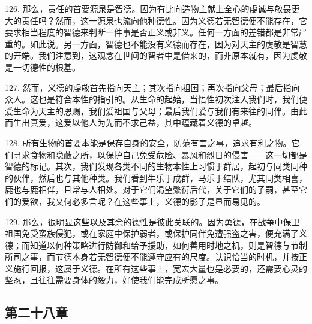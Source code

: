 \par

126. 那么，责任的首要源泉是智德。因为有比向造物主献上全心的虔诚与敬畏更大的责任吗？然而，这一源泉也流向他种德性。因为义德若无智德便不能存在，它要求相当程度的智德来判断一件事是否正义或非义。任何一方面的差错都是非常严重的。如此说。另一方面，智德也不能没有义德而存在，因为对天主的虔敬是智慧的开端。我们注意到，这观念在世间的智者中是借来的，而非原本就有，因为虔敬是一切德性的根基。\par

127. 然而，义德的虔敬首先指向天主；其次指向祖国；再次指向父母；最后指向众人。这也是符合本性的指引的。从生命的起始，当悟性初次注入我们时，我们便爱生命为天主的恩赐，我们爱祖国与父母；最后我们爱与我们有来往的同伴。由此而生出真爱，这爱以他人为先而不求己益，其中蕴藏着义德的卓越。\par

128. 所有生物的首要本能是保存自身的安全，防范有害之事，追求有利之物。它们寻求食物和隐蔽之所，以保护自己免受危险、暴风和烈日的侵害——这一切都是智德的标记。其次，我们发现各类不同的生物本性上习惯于群居，起初与同类同种的伙伴，然后也与其他种类。我们看到牛乐于成群，马乐于结队，尤其同类相喜，鹿也与鹿相伴，且常与人相处。对于它们渴望繁衍后代，关于它们的子嗣，甚至它们的爱欲，我又何必多言呢？在这些事上，义德的影子是显而易见的。\par

129. 那么，很明显这些以及其余的德性是彼此关联的。因为勇德，在战争中保卫祖国免受蛮族侵犯，或在家庭中保护弱者，或保护同伴免遭强盗之害，便充满了义德；而知道以何种策略进行防御和给予援助，如何善用时地之机，则是智德与节制所司之事，而节德本身若无智德便不能遵守应有的尺度。认识恰当的时机，并按正义施行回报，这属于义德。在所有这些事上，宽宏大量也是必要的，还需要心灵的坚忍，且往往需要身体的毅力，好使我们能完成所愿之事。\par


\subsection{第二十八章}

\par

